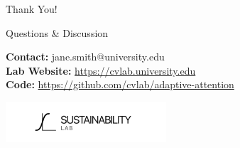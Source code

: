 \documentclass[10pt,aspectratio=169]{beamer}
\begin{document}
\begin{frame}[c]
\begin{center}
{\Large Thank You!}

\vspace{1em}
{\large Questions \& Discussion}

\vspace{2em}
\textbf{Contact:} jane.smith@university.edu \\
\textbf{Lab Website:} \url{https://cvlab.university.edu} \\
\textbf{Code:} \url{https://github.com/cvlab/adaptive-attention}

\vspace{2em}
\includegraphics[height=1.5cm]{../../assets/logo_light.pdf}
\end{center}
\end{frame}
\end{document}
